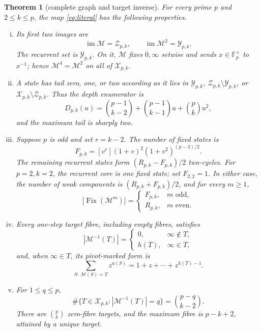 \documentclass[a4paper,10pt]{amsart}
\newtheorem{theorem}{Theorem}
\theoremstyle{remark}
\newcommand{\F}{\mathbb F}
\newcommand{\X}{\mathcal X}
\newcommand{\Y}{\mathcal Y}
\newcommand{\Z}{\mathcal Z}
\newcommand{\M}{\mathcal M}
\newcommand{\Fix}{\operatorname{Fix}}
\newcommand{\im}{\operatorname{im}}
\begin{document}
\begin{theorem}[complete graph and target inverse]\label{thm:main}
For every prime $p$ and $2\leq k\leq p$, the map \eqref{eq:literal}
has the following properties.
\begin{enumerate}[(i)]
\item Its first two images are
\begin{equation}\label{eq:images}
 \im\M=\Z_{p,k},\qquad \im\M^2=\Y_{p,k}.
\end{equation}
The recurrent set is $\Y_{p,k}$.  On it, $\M$ fixes $0,\infty$ setwise and
sends $x\in\F_p^\times$ to $x^{-1}$; hence $\M^4=\M^2$ on all of
$\X_{p,k}$.

\item A state has tail zero, one, or two according as it lies in
$\Y_{p,k}$, $\Z_{p,k}\setminus\Y_{p,k}$, or
$\X_{p,k}\setminus\Z_{p,k}$.  Thus the depth enumerator is
\begin{equation}\label{eq:depth}
 D_{p,k}(u)=\binom{p-1}{k-2}
 +\binom{p-1}{k-1}u+\binom pk u^2,
\end{equation}
and the maximum tail is sharply two.

\item Suppose $p$ is odd and set $r=k-2$.  The number of fixed states is
\begin{equation}\label{eq:fixed}
 F_{p,k}=[v^r](1+v)^2(1+v^2)^{(p-3)/2}.
\end{equation}
The remaining recurrent states form
$(R_{p,k}-F_{p,k})/2$ two-cycles.  For $p=2,k=2$, the recurrent core is one
fixed state; set $F_{2,2}=1$.  In either case, the number of weak components is
$(R_{p,k}+F_{p,k})/2$, and for every $m\geq1$,
\begin{equation}\label{eq:fixed-iterates}
 |\Fix(\M^m)|=
 \begin{cases}F_{p,k},&m\text{ odd},\\
 R_{p,k},&m\text{ even}.
 \end{cases}
\end{equation}

\item Every one-step target fibre, including empty fibres, satisfies
\begin{equation}\label{eq:fibre}
 |\M^{-1}(T)|=
 \begin{cases}
 0,&\infty\notin T,\\
 h(T),&\infty\in T,
 \end{cases}
\end{equation}
and, when $\infty\in T$, its pivot-marked form is
\begin{equation}\label{eq:marked}
 \sum_{S:\,\M(S)=T}z^{a(S)}
   =1+z+\cdots+z^{h(T)-1}.
\end{equation}

\item For $1\leq q\leq p$,
\begin{equation}\label{eq:fibre-distribution}
 \#\{T\in\X_{p,k}:|\M^{-1}(T)|=q\}
   =\binom{p-q}{k-2}.
\end{equation}
There are $\binom pk$ zero-fibre targets, and the maximum fibre is
$p-k+2$, attained by a unique target.
\end{enumerate}
\end{theorem}
\end{document}

